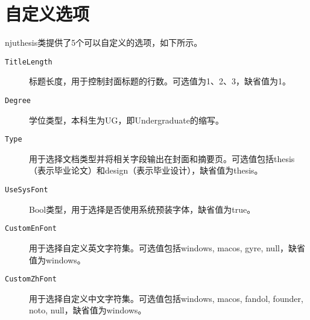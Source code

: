\section{自定义选项}
\label{sec:classoptions}

njuthesis类提供了5个可以自定义的选项，如下所示。
\begin{description}
    \item[\texttt{TitleLength}] 标题长度，用于控制封面标题的行数。可选值为1、2、3，缺省值为1。
    \item[\texttt{Degree}] 学位类型，本科生为UG，即Undergraduate的缩写。
    \item[\texttt{Type}] 用于选择文档类型并将相关字段输出在封面和摘要页。可选值包括thesis（表示毕业论文）和design（表示毕业设计），缺省值为thesis。    \item[\texttt{UseSysFont}] Bool类型，用于选择是否使用系统预装字体，缺省值为true。
    \item[\texttt{CustomEnFont}] 用于选择自定义英文字符集。可选值包括windows, macos, gyre, null，缺省值为windows。
    \item[\texttt{CustomZhFont}] 用于选择自定义中文字符集。可选值包括windows, macos, fandol, founder, noto, null，缺省值为windows。
\end{description}

